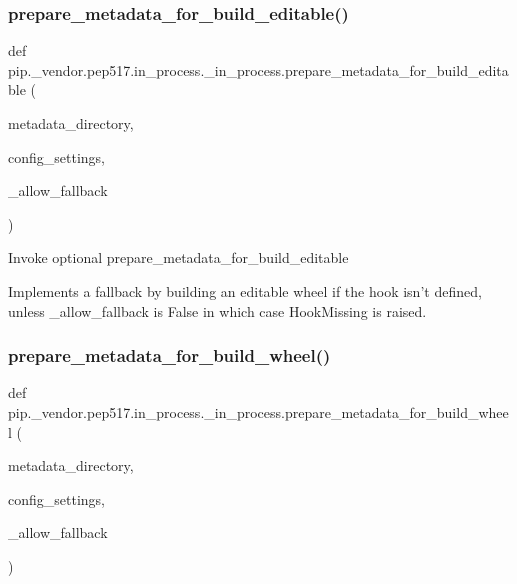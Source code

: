\subsubsection{\texorpdfstring{prepare\+\_\+metadata\+\_\+for\+\_\+build\+\_\+editable()}{prepare\_metadata\_for\_build\_editable()}}
{\footnotesize\ttfamily def pip.\+\_\+vendor.\+pep517.\+in\+\_\+process.\+\_\+in\+\_\+process.\+prepare\+\_\+metadata\+\_\+for\+\_\+build\+\_\+editable (\begin{DoxyParamCaption}\item[{}]{metadata\+\_\+directory,  }\item[{}]{config\+\_\+settings,  }\item[{}]{\+\_\+allow\+\_\+fallback }\end{DoxyParamCaption})}

\begin{DoxyVerb}Invoke optional prepare_metadata_for_build_editable

Implements a fallback by building an editable wheel if the hook isn't
defined, unless _allow_fallback is False in which case HookMissing is
raised.
\end{DoxyVerb}
 \mbox{\label{namespacepip_1_1__vendor_1_1pep517_1_1in__process_1_1__in__process_aa97e573cd2afd965748be379151244a9}} 
\subsubsection{\texorpdfstring{prepare\+\_\+metadata\+\_\+for\+\_\+build\+\_\+wheel()}{prepare\_metadata\_for\_build\_wheel()}}
{\footnotesize\ttfamily def pip.\+\_\+vendor.\+pep517.\+in\+\_\+process.\+\_\+in\+\_\+process.\+prepare\+\_\+metadata\+\_\+for\+\_\+build\+\_\+wheel (\begin{DoxyParamCaption}\item[{}]{metadata\+\_\+directory,  }\item[{}]{config\+\_\+settings,  }\item[{}]{\+\_\+allow\+\_\+fallback }\end{DoxyParamCaption})}

